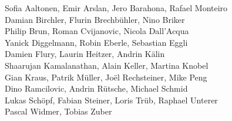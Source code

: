 %
%
%
Sofia Aaltonen,		%
Emir Arslan, 		%
Jero Barahona,		%
Rafael Monteiro%
\\
Damian Birchler,	%
Flurin Brechbühler,	%
Nino Briker%
\\
Philip Brun,		%
Roman Cvijanovic,	%
Nicola Dall'Acqua%
\\
Yanick Diggelmann,	%
Robin Eberle,		%
Sebastian Eggli%
\\
Damien Flury,		%
Laurin Heitzer,		%
Andrin Kälin%
\\
Shaarujan Kamalanathan,	%
Alain Keller,		%
Martina Knobel%
\\
Gian Kraus,		%
Patrik Müller,		%
Joël Rechsteiner,	%
Mike Peng%
\\
Dino Ramcilovic,	%
Andrin Rütsche,		%
Michael Schmid%
\\
Lukas Schöpf,		%
Fabian Steiner,		%
Loris Trüb,		%
Raphael Unterer%
\\
Pascal Widmer,		%
Tobias Zuber%
\\
